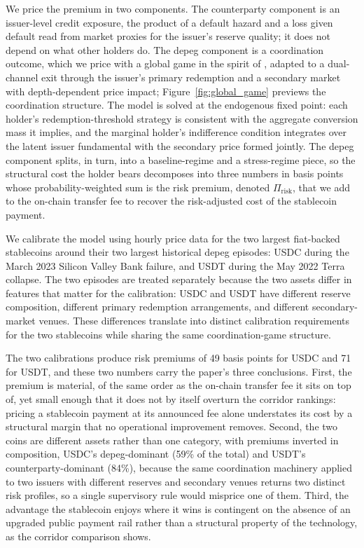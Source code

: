 We price the premium in two components. The counterparty component is an issuer-level credit exposure, the product of a default hazard and a loss given default read from market proxies for the issuer's reserve quality; it does not depend on what other holders do. The depeg component is a coordination outcome, which we price with a global game in the spirit of \citet{morris_shin_1998}, adapted to a dual-channel exit through the issuer's primary redemption and a secondary market with depth-dependent price impact; Figure~\ref{fig:global_game} previews the coordination structure. The model is solved at the endogenous fixed point: each holder's redemption-threshold strategy is consistent with the aggregate conversion mass it implies, and the marginal holder's indifference condition integrates over the latent issuer fundamental with the secondary price formed jointly. The depeg component splits, in turn, into a baseline-regime and a stress-regime piece, so the structural cost the holder bears decomposes into three numbers in basis points whose probability-weighted sum is the risk premium, denoted $\Pi_{\text{risk}}$, that we add to the on-chain transfer fee to recover the risk-adjusted cost of the stablecoin payment.

We calibrate the model using hourly price data for the two largest fiat-backed stablecoins around their two largest historical depeg episodes: USDC during the March 2023 Silicon Valley Bank failure, and USDT during the May 2022 Terra collapse. The two episodes are treated separately because the two assets differ in features that matter for the calibration: USDC and USDT have different reserve composition, different primary redemption arrangements, and different secondary-market venues. These differences translate into distinct calibration requirements for the two stablecoins while sharing the same coordination-game structure.

The two calibrations produce risk premiums of 49 basis points for USDC and 71 for USDT, and these two numbers carry the paper's three conclusions. First, the premium is material, of the same order as the on-chain transfer fee it sits on top of, yet small enough that it does not by itself overturn the corridor rankings: pricing a stablecoin payment at its announced fee alone understates its cost by a structural margin that no operational improvement removes. Second, the two coins are different assets rather than one category, with premiums inverted in composition, USDC's depeg-dominant (59\% of the total) and USDT's counterparty-dominant (84\%), because the same coordination machinery applied to two issuers with different reserves and secondary venues returns two distinct risk profiles, so a single supervisory rule would misprice one of them. Third, the advantage the stablecoin enjoys where it wins is contingent on the absence of an upgraded public payment rail rather than a structural property of the technology, as the corridor comparison shows.

